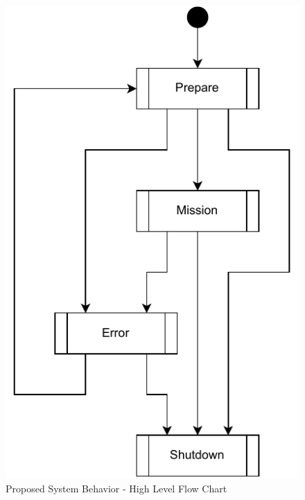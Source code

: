 \begin{figure}[H]
    \centering
    \includegraphics[scale=0.8]{ch3/assets/MDU_MAIN.pdf}
    \caption{Proposed System Behavior - High Level Flow Chart}
    \label{fig:MDU_MAIN}
\end{figure}



